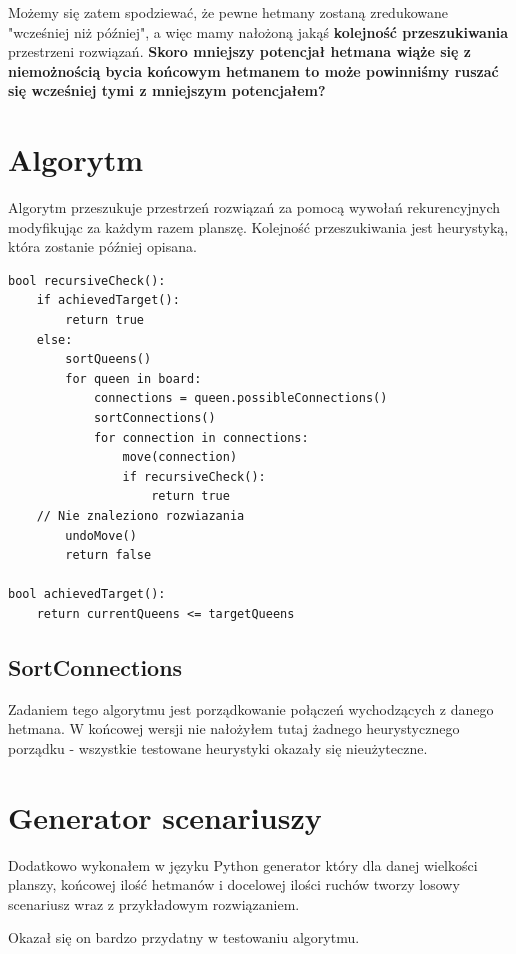 \documentclass{article}
\begin{document}
Możemy się zatem spodziewać, że pewne hetmany zostaną zredukowane "wcześniej niż później", a więc mamy nałożoną jakąś \textbf{kolejność przeszukiwania} przestrzeni rozwiązań. \textbf{Skoro mniejszy potencjał hetmana wiąże się z niemożnością bycia końcowym hetmanem to może powinniśmy ruszać się  wcześniej tymi z mniejszym potencjałem?}

\section{Algorytm}

Algorytm przeszukuje przestrzeń rozwiązań za pomocą wywołań rekurencyjnych modyfikując za każdym razem planszę. Kolejność przeszukiwania jest heurystyką, która zostanie później opisana.

\begin{lstlisting}
bool recursiveCheck():
	if achievedTarget():
		return true
	else:
		sortQueens()
		for queen in board:
			connections = queen.possibleConnections()
			sortConnections()
			for connection in connections:
				move(connection)
				if recursiveCheck():
					return true
	// Nie znaleziono rozwiazania	
		undoMove()	
		return false
		
bool achievedTarget():
	return currentQueens <= targetQueens
\end{lstlisting}

\subsection{SortConnections}

Zadaniem tego algorytmu jest porządkowanie połączeń wychodzących z danego hetmana. W końcowej wersji nie nałożyłem tutaj żadnego heurystycznego porządku - wszystkie testowane heurystyki okazały się nieużyteczne.

\section{Generator scenariuszy}

Dodatkowo wykonałem w języku Python generator który dla danej wielkości planszy, końcowej ilość hetmanów i docelowej ilości ruchów tworzy losowy scenariusz wraz z przykładowym rozwiązaniem.

Okazał się on bardzo przydatny w testowaniu algorytmu.
\end{document}
